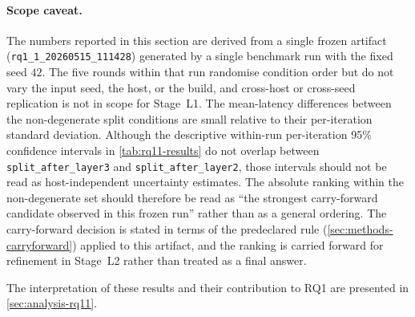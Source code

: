 \paragraph{Scope caveat.} The numbers reported in this section are derived from a single frozen artifact (\texttt{rq1\_1\_20260515\_111428}) generated by a single benchmark run with the fixed seed $42$. The five rounds within that run randomise condition order but do not vary the input seed, the host, or the build, and cross-host or cross-seed replication is not in scope for Stage~L1. The mean-latency differences between the non-degenerate split conditions are small relative to their per-iteration standard deviation. Although the descriptive within-run per-iteration 95\% confidence intervals in \cref{tab:rq11-results} do not overlap between \texttt{split\_after\_layer3} and \texttt{split\_after\_layer2}, those intervals should not be read as host-independent uncertainty estimates. The absolute ranking within the non-degenerate set should therefore be read as ``the strongest carry-forward candidate observed in this frozen run'' rather than as a general ordering. The carry-forward decision is stated in terms of the predeclared rule (\cref{sec:methods-carryforward}) applied to this artifact, and the ranking is carried forward for refinement in Stage~L2 rather than treated as a final answer.

The interpretation of these results and their contribution to RQ1 are presented in
\cref{sec:analysis-rq11}.
